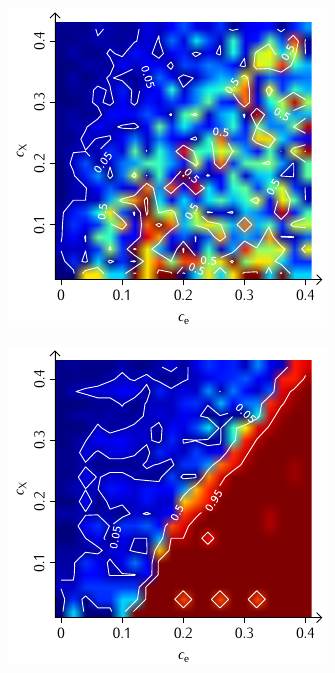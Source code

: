 \documentclass[a4paper, 10pt, twoside, openany]{book} %
\begin{document}
\begin{figure}
\begin{minipage}[t]{0.48\textwidth}
			\label{H_random_P}
		\end{minipage}
		\hfill
		\begin{minipage}[t]{0.48\textwidth}
			\includegraphics[width=\textwidth]{Abbildungen/Phasendiagramme/Konturen/H_penalty_random_P.pdf}
			\label{H_penalty_random_P}
		\end{minipage}
		\begin{minipage}[t]{0.48\textwidth}
			\includegraphics[width=\textwidth]{Abbildungen/Phasendiagramme/Konturen/H_individual_P.pdf}

\end{minipage}
\end{figure}
\end{document}
